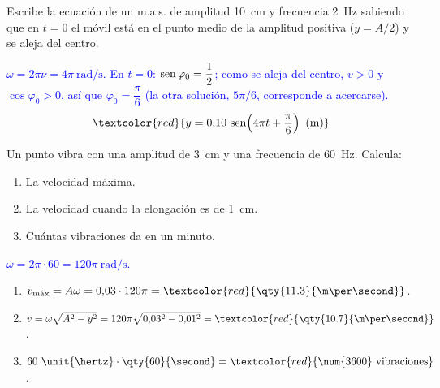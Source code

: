 \begin{exercise}
    Escribe la ecuación de un m.a.s. de amplitud \qty{10}{\cm} y frecuencia \qty{2}{\hertz} sabiendo que en \(t = 0\) el móvil
    está en el punto medio de la amplitud positiva (\(y = A/2\)) y se aleja del centro.
    \begin{solu}
        \textcolor{blue}{\(\omega = 2\pi\nu = 4\pi\ \unit{\radian\per\second}\). En \(t = 0\): \(\operatorname{sen}\varphi_0 = \dfrac{1}{2}\); como se aleja del centro, \(v > 0\) y
        \(\cos\varphi_0 > 0\), así que \(\varphi_0 = \dfrac{\pi}{6}\) (la otra solución, \(5\pi/6\), corresponde a acercarse).}
        \[ \textcolor{red}{y = 0{,}10\,\sen\!\left(4\pi t + \dfrac{\pi}{6}\right)\ \text{(m)}} \]
    \end{solu}
\end{exercise}

\begin{exercise}
    Un punto vibra con una amplitud de \qty{3}{\cm} y una frecuencia de \qty{60}{\hertz}. Calcula:
    \begin{enumerate}[label=\letraminuscula]
        \item La velocidad máxima.
        \item La velocidad cuando la elongación es de \qty{1}{\cm}.
        \item Cuántas vibraciones da en un minuto.
    \end{enumerate}
    \begin{solu}
        \textcolor{blue}{\(\omega = 2\pi\cdot 60 = 120\pi\ \unit{\radian\per\second}\).}
        \begin{enumerate}[label=\letraminuscula]
            \item \(v_{\text{máx}} = A\omega = 0{,}03\cdot 120\pi = \textcolor{red}{\qty{11.3}{\m\per\second}}\).
            \item \(v = \omega\sqrt{A^2 - y^2} = 120\pi\sqrt{0{,}03^2 - 0{,}01^2} = \textcolor{red}{\qty{10.7}{\m\per\second}}\).
            \item \(60\ \unit{\hertz}\cdot\qty{60}{\second} = \textcolor{red}{\num{3600}\ \text{vibraciones}}\).
        \end{enumerate}
    \end{solu}
\end{exercise}

